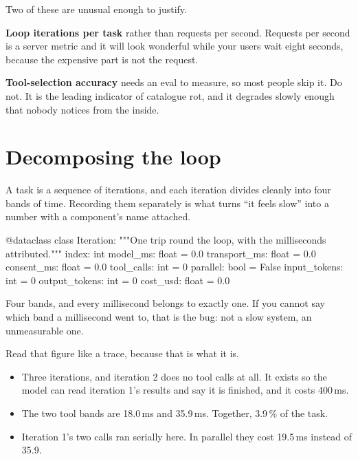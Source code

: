 Two of these are unusual enough to justify.

\textbf{Loop iterations per task} rather than requests per second. Requests per
second is a server metric and it will look wonderful while your users wait eight
seconds, because the expensive part is not the request.

\textbf{Tool-selection accuracy} needs an eval to measure, so most people skip
it. Do not. It is the leading indicator of catalogue rot, and it degrades slowly
enough that nobody notices from the inside.

\section{Decomposing the loop}

A task is a sequence of iterations, and each iteration divides cleanly into four
bands of time. Recording them separately is what turns ``it feels slow'' into a
number with a component's name attached.

\begin{py}
@dataclass
class Iteration:
    """One trip round the loop, with the milliseconds attributed."""
    index: int
    model_ms: float = 0.0
    transport_ms: float = 0.0
    consent_ms: float = 0.0
    tool_calls: int = 0
    parallel: bool = False
    input_tokens: int = 0
    output_tokens: int = 0
    cost_usd: float = 0.0
\end{py}

Four bands, and every millisecond belongs to exactly one. If you cannot say which
band a millisecond went to, that is the bug: not a slow system, an unmeasurable
one.


Read that figure like a trace, because that is what it is.

\begin{itemize}[leftmargin=1.6em, itemsep=3pt]
\item Three iterations, and iteration 2 does no tool calls at all. It exists so
the model can read iteration 1's results and say it is finished, and it costs
400\,ms.
\item The two tool bands are 18.0\,ms and 35.9\,ms. Together, 3.9\,\% of the
task.
\item Iteration 1's two calls ran serially here. In parallel they cost 19.5\,ms
instead of 35.9.
\end{itemize}


